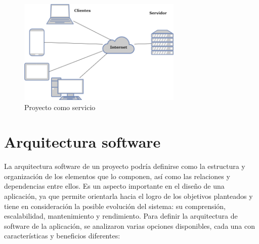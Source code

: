 \begin{figure}[ht!]
    \centering
    \includegraphics[height = 50mm]{imagenes/proyecto_servicio.drawio.png}
    \caption{Proyecto como servicio}
    \label{fig:proyecto_como_servicio}
\end{figure}


\section{Arquitectura software}\label{sec:arquitectura_software}
La arquitectura software de un proyecto podría definirse como la estructura y organización de los elementos que lo componen, así como las relaciones y dependencias entre ellos. Es un aspecto importante en el diseño de una aplicación, ya que permite orientarla hacia el logro de los objetivos planteados y tiene en consideración la posible evolución del sistema: su comprensión, escalabilidad, mantenimiento y rendimiento\cite{fernandez2006arquitectura}.
Para definir la arquitectura de software de la aplicación, se analizaron varias opciones disponibles, cada una con características y beneficios diferentes\cite{albin2003art}\cite{garimilla2024art}:

